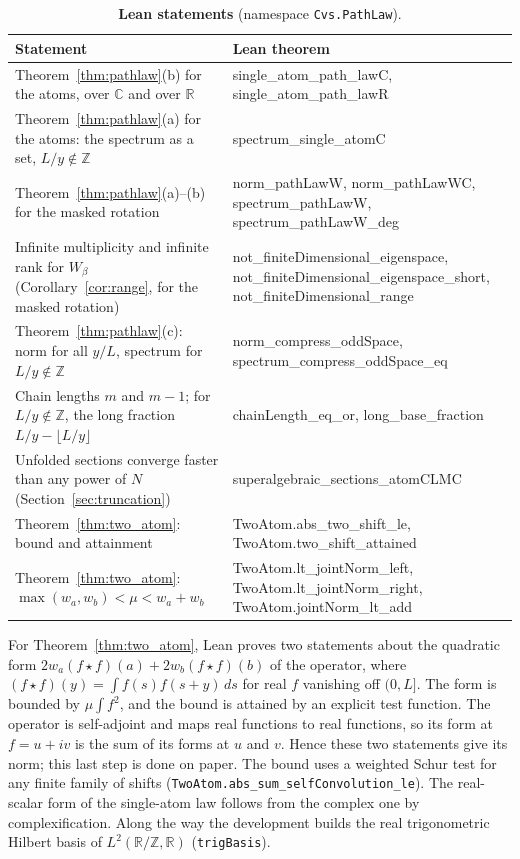 \documentclass[11pt,a4paper]{article}
\theoremstyle{plain}
\theoremstyle{definition}
\theoremstyle{remark}
\newcommand{\C}{\mathbb{C}}
\newcommand{\R}{\mathbb{R}}
\newcommand{\Z}{\mathbb{Z}}
\begin{document}
\begin{table}[htbp]
\centering
\footnotesize
\caption{\textbf{Lean statements} (namespace \texttt{Cvs.PathLaw}).}\label{tab:lean_map}
\vspace{0.5em}
\begin{tabular}{>{\raggedright\arraybackslash}p{} >{\ttfamily\raggedright\arraybackslash}p{}}
\toprule
\normalfont\textbf{Statement} & \normalfont\textbf{Lean theorem} \\
\midrule
Theorem~\ref{thm:pathlaw}(b) for the atoms, over $\C$ and over $\R$ & single\_atom\_path\_lawC, single\_atom\_path\_lawR \\
Theorem~\ref{thm:pathlaw}(a) for the atoms: the spectrum as a set, $L/y \notin \Z$ & spectrum\_single\_atomC \\
Theorem~\ref{thm:pathlaw}(a)--(b) for the masked rotation & norm\_pathLawW, norm\_pathLawWC, spectrum\_pathLawW, spectrum\_pathLawW\_deg \\
Infinite multiplicity and infinite rank for $W_\beta$ (Corollary~\ref{cor:range}, for the masked rotation) & not\_finiteDimensional\_eigenspace, not\_finiteDimensional\_eigenspace\_short, not\_finiteDimensional\_range \\
Theorem~\ref{thm:pathlaw}(c): norm for all $y/L$, spectrum for $L/y \notin \Z$ & norm\_compress\_oddSpace, spectrum\_compress\_oddSpace\_eq \\
Chain lengths $m$ and $m-1$; for $L/y \notin \Z$, the long fraction $L/y - \lfloor L/y\rfloor$ & chainLength\_eq\_or, long\_base\_fraction \\
Unfolded sections converge faster than any power of $N$ (Section~\ref{sec:truncation}) & superalgebraic\_sections\_atomCLMC \\
Theorem~\ref{thm:two_atom}: bound and attainment & TwoAtom.abs\_two\_shift\_le, TwoAtom.two\_shift\_attained \\
Theorem~\ref{thm:two_atom}: $\max(w_a, w_b) < \mu < w_a + w_b$ & TwoAtom.lt\_jointNorm\_left, TwoAtom.lt\_jointNorm\_right, TwoAtom.jointNorm\_lt\_add \\
\bottomrule
\end{tabular}
\end{table}

For Theorem~\ref{thm:two_atom}, Lean proves two statements about the quadratic form $2w_a (f\star f)(a) + 2w_b (f\star f)(b)$ of the operator, where $(f\star f)(y) = \int f(s) f(s+y)\,ds$ for real $f$ vanishing off $(0, L]$. The form is bounded by $\mu \int f^2$, and the bound is attained by an explicit test function. The operator is self-adjoint and maps real functions to real functions, so its form at $f = u + iv$ is the sum of its forms at $u$ and $v$. Hence these two statements give its norm; this last step is done on paper. The bound uses a weighted Schur test for any finite family of shifts (\texttt{TwoAtom.abs\_sum\_selfConvolution\_le}). The real-scalar form of the single-atom law follows from the complex one by complexification. Along the way the development builds the real trigonometric Hilbert basis of $L^2(\R/\Z, \R)$ (\texttt{trigBasis}).
\end{document}
